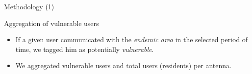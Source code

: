 \documentclass{beamer}
\begin{document}
\begin{frame}{Methodology (1)}
\begin{block}{Aggregation of vulnerable users}
\begin{itemize}
			\item If a given user communicated with the \textit{endemic area} in the selected period of time, we tagged him as potentially \textit{vulnerable}.


			\item  We aggregated vulnerable users and total users (residents) per antenna.
			
			
		\end{itemize}
	\end{block}
\end{frame}
\end{document}
